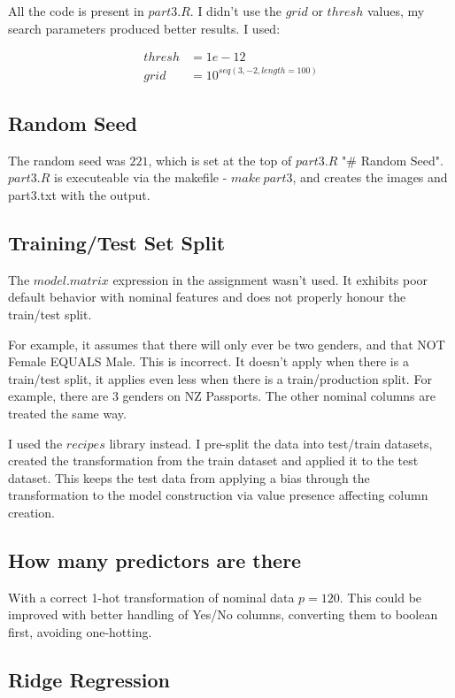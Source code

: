 \documentclass[11pt]{article}
\begin{document}
All the code is present in \(part3.R\). I didn't use the \(grid\) or \(thresh\) values, my search parameters produced better results. I used:

\begin{align}
	thresh &= 1e-12 \\
	grid &= 10^{seq(3,-2,length=100)}
\end{align}

\subsection{Random Seed}

The random seed was \(221\), which is set at the top of \(part3.R\) "\# Random Seed". \(part3.R\) is executeable via the makefile - \(make\ part3\), and creates the images and part3.txt with the output.

\subsection{Training/Test Set Split}

The \(model.matrix\) expression in the assignment wasn't used. It exhibits poor default behavior with nominal features and does not properly honour the train/test split.

For example, it assumes that there will only ever be two genders, and that NOT Female EQUALS Male. This is incorrect. It doesn't apply when there is a train/test split, it applies even less when there is a train/production split. For example, there are 3 genders on NZ Passports. The other nominal columns are treated the same way.

I used the \(recipes\) library instead. I pre-split the data into test/train datasets, created the transformation from the train dataset and applied it to the test dataset. This keeps the test data from applying a bias through the transformation to the model construction via value presence affecting column creation.

\subsection{How many predictors are there}

With a correct 1-hot transformation of nominal data \(p=120\). This could be improved with better handling of Yes/No columns, converting them to boolean first, avoiding one-hotting.

\subsection{Ridge Regression}
\end{document}
